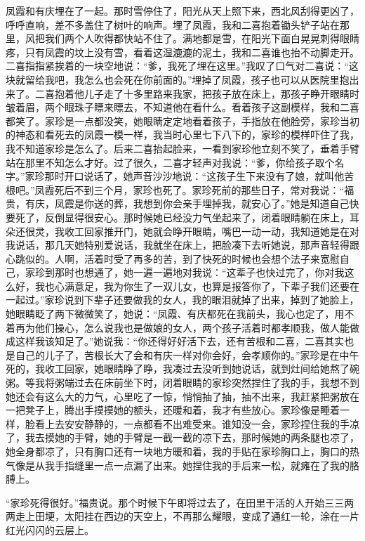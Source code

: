 \documentclass[12pt,UTF8]{ctexbook}
\begin{document}
凤霞和有庆埋在了一起。那时雪停住了，阳光从天上照下来，西北风刮得更凶了，呼呼直响，差不多盖住了树叶的响声。埋了凤霞，我和二喜抱着锄头铲子站在那里，风把我们两个人吹得都快站不住了。满地都是雪，在阳光下面白晃晃刺得眼睛疼，只有凤霞的坟上没有雪，看着这湿漉漉的泥土，我和二喜谁也抬不动脚走开。二喜指指紧挨着的一块空地说：“爹，我死了埋在这里。”我叹了口气对二喜说：“这块就留给我吧，我怎么也会死在你前面的。”埋掉了凤霞，孩子也可以从医院里抱出来了。二喜抱着他儿子走了十多里路来我家，把孩子放在床上，那孩子睁开眼睛时皱着眉，两个眼珠子瞟来瞟去，不知道他在看什么。看着孩子这副模样，我和二喜都笑了。家珍是一点都没笑，她眼睛定定地看着孩子，手指放在他脸旁，家珍当初的神态和看死去的凤霞一模一样，我当时心里七下八下的，家珍的模样吓住了我，我不知道家珍是怎么了。后来二喜抬起脸来，一看到家珍他立刻不笑了，垂着手臂站在那里不知怎么才好。过了很久，二喜才轻声对我说：“爹，你给孩子取个名字。”家珍那时开口说话了，她声音沙沙地说：“这孩子生下来没有了娘，就叫他苦根吧。”凤霞死后不到三个月，家珍也死了。家珍死前的那些日子，常对我说：“福贵，有庆，凤霞是你送的葬，我想到你会亲手埋掉我，就安心了。”她是知道自己快要死了，反倒显得很安心。那时候她已经没力气坐起来了，闭着眼睛躺在床上，耳朵还很灵，我收工回家推开门，她就会睁开眼睛，嘴巴一动一动，我知道她是在对我说话，那几天她特别爱说话，我就坐在床上，把脸凑下去听她说，那声音轻得跟心跳似的。人啊，活着时受了再多的苦，到了快死的时候也会想个法子来宽慰自己，家珍到那时也想通了，她一遍一遍地对我说：“这辈子也快过完了，你对我这么好，我也心满意足，我为你生了一双儿女，也算是报答你了，下辈子我们还要在一起过。”家珍说到下辈子还要做我的女人，我的眼泪就掉了出来，掉到了她脸上，她眼睛眨了两下微微笑了，她说：“凤霞、有庆都死在我前头，我心也定了，用不着再为他们操心，怎么说我也是做娘的女人，两个孩子活着时都孝顺我，做人能做成这样我该知足了。”她说我：“你还得好好活下去，还有苦根和二喜，二喜其实也是自己的儿子了，苦根长大了会和有庆一样对你会好，会孝顺你的。”家珍是在中午死的，我收工回家，她眼睛睁了睁，我凑过去没听到她说话，就到灶间给她熬了碗粥。等我将粥端过去在床前坐下时，闭着眼睛的家珍突然捏住了我的手，我想不到她还会有这么大的力气，心里吃了一惊，悄悄抽了抽，抽不出来，我赶紧把粥放在一把凳子上，腾出手摸摸她的额头，还暖和着，我才有些放心。家珍像是睡着一样，脸看上去安安静静的，一点都看不出难受来。谁知没一会，家珍捏住我的手凉了，我去摸她的手臂，她的手臂是一截一截的凉下去，那时候她的两条腿也凉了，她全身都凉了，只有胸口还有一块地方暖和着，我的手贴在家珍胸口上，胸口的热气像是从我手指缝里一点一点漏了出来。她捏住我的手后来一松，就瘫在了我的胳膊上。

“家珍死得很好。”福贵说。那个时候下午即将过去了，在田里干活的人开始三三两两走上田埂，太阳挂在西边的天空上，不再那么耀眼，变成了通红一轮，涂在一片红光闪闪的云层上。
\end{document}

